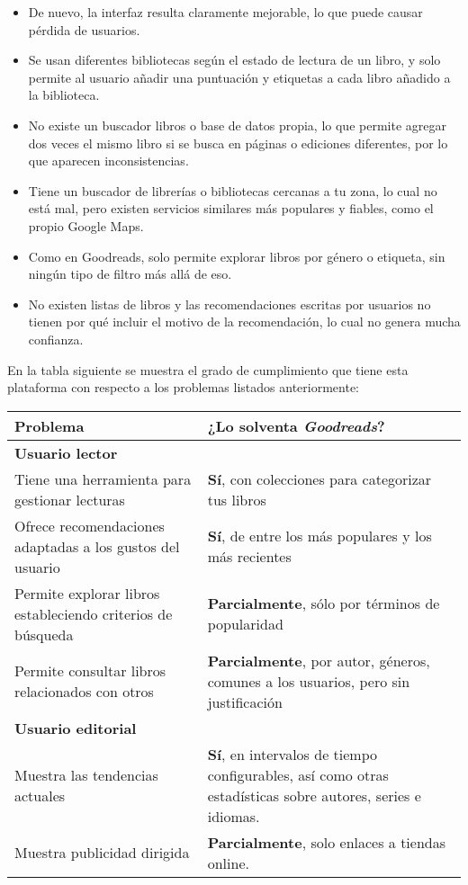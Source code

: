 \begin{itemize}
\item De nuevo, la interfaz resulta claramente mejorable, lo que puede causar pérdida de usuarios.
\item Se usan diferentes bibliotecas según el estado de lectura de un libro, y solo permite al usuario añadir una puntuación y etiquetas a cada libro añadido a la biblioteca.
\item No existe un buscador libros o base de datos propia, lo que permite agregar dos veces el mismo libro si se busca en páginas o ediciones diferentes, por lo que aparecen inconsistencias.
\item Tiene un buscador de librerías o bibliotecas cercanas a tu zona, lo cual no está mal, pero existen servicios similares más populares y fiables, como el propio Google Maps.
\item Como en Goodreads, solo permite explorar libros por género o etiqueta, sin ningún tipo de filtro más allá de eso.
\item No existen listas de libros y las recomendaciones escritas por usuarios no tienen por qué incluir el motivo de la recomendación, lo cual no genera mucha confianza.
\end{itemize}

En la tabla siguiente se muestra el grado de cumplimiento que tiene esta plataforma con respecto a los problemas listados anteriormente:

\begin{table}[H]
    \begin{tabularx}{\linewidth}{|X|X|}
        \hline
        \textbf{Problema} & \textbf{¿Lo solventa \textit{Goodreads}?} \\
        \hline
        \hline
        \multicolumn{2}{|l|}{\textbf{Usuario lector}} \\
        \hline
        Tiene una herramienta para gestionar lecturas     & \textbf{Sí}, con colecciones para categorizar tus libros \\ 
        \hline
        Ofrece recomendaciones adaptadas a los gustos del usuario & \textbf{Sí}, de entre los más populares y los más recientes \\ 
        \hline
        Permite explorar libros estableciendo criterios de búsqueda   & \textbf{Parcialmente}, sólo por términos de popularidad \\ 
        \hline
        Permite consultar libros relacionados con otros   & \textbf{Parcialmente}, por autor, géneros, comunes a los usuarios, pero sin justificación \\ 
        \hline
        \multicolumn{2}{|l|}{ \textbf{Usuario editorial}} \\
        \hline
        Muestra las tendencias actuales     & \textbf{Sí}, en intervalos de tiempo configurables, así como otras estadísticas sobre autores, series e idiomas. \\ 
        \hline
        Muestra publicidad dirigida     & \textbf{Parcialmente}, solo enlaces a tiendas online. \\ 
        \hline
    \end{tabularx}
\end{table}

